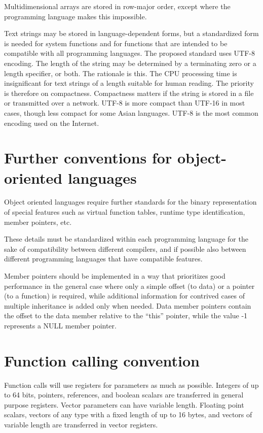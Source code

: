 \documentclass[forwardcom.tex]{subfiles}
\begin{document}
Multidimensional arrays are stored in row-major order, except where the programming language makes this impossible. 
\vv

Text strings may be stored in language-dependent forms, but a standardized form is needed for system functions and for functions that are intended to be compatible with all programming languages. The proposed standard uses UTF-8 encoding. The length of the string may be determined by a terminating zero or a length specifier, or both.
The rationale is this. The CPU processing time is insignificant for text strings of a length suitable for human reading. The priority is therefore on compactness. Compactness matters if the string is stored in a file or transmitted over a network. UTF-8 is more compact than UTF-16 in most cases, though less compact for some Asian languages. UTF-8 is the most common encoding used on the Internet.

\section{Further conventions for object-oriented languages}
Object oriented languages require further standards for the binary representation of special features such as virtual function tables, runtime type identification, member pointers, etc. 
\vv

These details must be standardized within each programming language for the sake of compatibility between different compilers, and if possible also between different programming languages that have compatible features. 
\vv

Member pointers should be implemented in a way that prioritizes good performance in the general case where only a simple offset (to data) or a pointer (to a function) is required, while additional information for contrived cases of multiple inheritance is added only when needed. Data member pointers contain the offset to the data member relative to the ``this'' pointer, while the value -1 represents a NULL member pointer. 
\vv

\section{Function calling convention}\label{chap:functionCallingConventions}
Function calls will use registers for parameters as much as possible. Integers of up to 64 bits, pointers, references, and boolean scalars are transferred in general purpose registers. Vector parameters can have variable length. Floating point scalars, vectors of any type with a fixed length of up to 16 bytes, and vectors of variable length are transferred in vector registers. 
\vv
\end{document}
